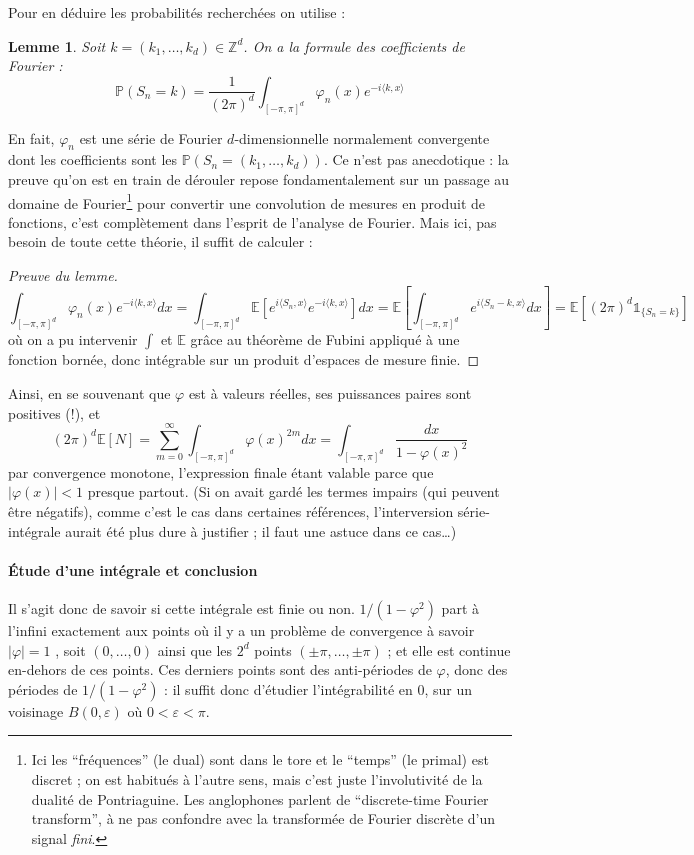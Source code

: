 \documentclass[a4paper, 11pt]{article}
\def\Z{\mathbb{Z}}
\def\P{\mathbb{P}}
\def\E{\mathbb{E}}
\def\Indic{\mathbb{1}}
\newtheorem*{lemma}{Lemme}
\begin{document}
Pour en déduire les probabilités recherchées on utilise :
\begin{lemma} Soit $k = (k_1, \ldots, k_d) \in \Z^d$. On a la formule des
  coefficients de Fourier :
  \[ \displaystyle \P(S_n = k) = \frac{1}{(2\pi)^d} \int_{[-\pi,\pi]^d}
    \varphi_n(x)e^{-i\langle k,x \rangle} \]
\end{lemma}
En fait, $\varphi_n$ est une série de Fourier $d$-dimensionnelle normalement
convergente dont les coefficients sont les $\P(S_n = (k_1, \ldots, k_d))$. Ce
n'est pas anecdotique : la preuve qu'on est en train de dérouler repose
fondamentalement sur un passage au domaine de Fourier\footnote{Ici les
  \enquote{fréquences} (le dual) sont dans le tore et le \enquote{temps} (le
  primal) est discret ; on est habitués à l'autre sens, mais c'est juste
  l'involutivité de la dualité de Pontriaguine. Les anglophones parlent de
  \enquote{discrete-time Fourier transform}, à ne pas confondre avec la
  transformée de Fourier discrète d'un signal \emph{fini}.} pour convertir une
convolution de mesures en produit de fonctions, c'est complètement dans l'esprit
de l'analyse de Fourier. Mais ici, pas besoin de toute cette théorie, il suffit
de calculer :
\begin{proof}[Preuve du lemme]
  \[ \int_{[-\pi,\pi]^d} \varphi_n(x)e^{-i\langle k,x \rangle} dx =
    \int_{[-\pi,\pi]^d} \E\left[ e^{i\langle S_n, x \rangle} e^{-i\langle k,x
        \rangle}\right] dx
    = \E\left[ \int_{[-\pi,\pi]^d} e^{i\langle S_n - k, x \rangle} dx \right]
    = \E\left[ (2\pi)^d \Indic_{\{S_n = k\}} \right] \]
  où on a pu intervenir $\int$ et $\E$ grâce au théorème de Fubini appliqué à
  une fonction bornée, donc intégrable sur un produit d'espaces de mesure finie.
\end{proof}
Ainsi, en se souvenant que $\varphi$ est à valeurs réelles, ses puissances
paires sont positives (!), et
\[ (2\pi)^d \E[N] = \sum_{m=0}^{\infty} \int_{[-\pi,\pi]^d} \varphi(x)^{2m} dx
  = \int_{[-\pi,\pi]^d} \frac{dx}{1 - \varphi(x)^2}\]
par convergence monotone, l'expression finale étant valable parce que
$|\varphi(x)| < 1$ presque partout. (Si on avait gardé les termes impairs (qui
peuvent être négatifs), comme c'est le cas dans certaines références,
l'interversion série-intégrale aurait été plus dure à justifier ; il faut une
astuce dans ce cas…)

\paragraph{Étude d'une intégrale et conclusion} Il s'agit donc de savoir si
cette intégrale est finie ou non. $1/(1-\varphi^2)$ part à l'infini exactement
aux points où il y a un problème de convergence à savoir $|\varphi| = 1$ , soit
$(0,\ldots,0)$ ainsi que les $2^d$ points $(\pm \pi, \ldots, \pm \pi)$ ; et elle
est continue en-dehors de ces points. Ces derniers points sont des anti-périodes
de $\varphi$, donc des périodes de $1/(1-\varphi^2)$ : il suffit donc d'étudier
l'intégrabilité en 0, sur un voisinage $B(0,\varepsilon)$ où $0 < \varepsilon <
\pi$.
\end{document}
